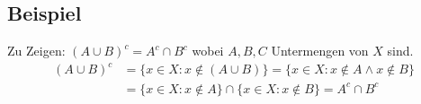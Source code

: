 \begin{multicols}{2}
\subsection{Beispiel}
Zu Zeigen: $(A \cup B)^c = A^c \cap B^c$ wobei $A, B, C$ Untermengen von $X$ sind.
\begin{align*}
(A \cup B)^c &= \{x \in X: x \not\in (A \cup B)\} = \{x \in X: x \not\in A \land x \not\in B\}\\
&= \{x \in X: x \not\in A\} \cap \{x \in X: x \not\in B\} = A^c \cap B^c
\end{align*}

\end{multicols}